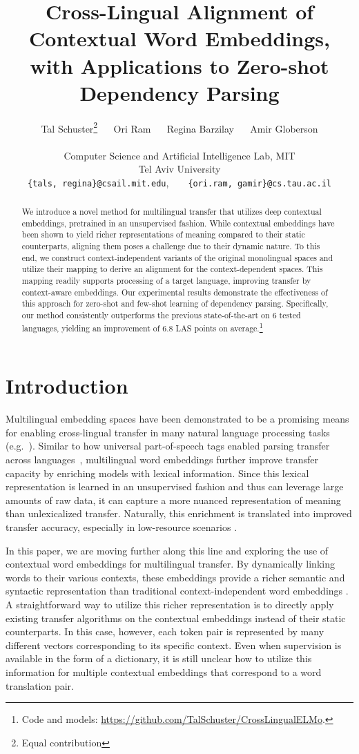 \documentclass[11pt,a4paper]{article}
\title{Cross-Lingual Alignment of Contextual Word Embeddings,  \\ with Applications to Zero-shot Dependency Parsing}
\author{Tal Schuster\thanks{\;\; Equal contribution} ~~ Ori Ram ~~
Regina Barzilay ~~
Amir Globerson \\
\mbox{}\\
Computer Science and Artificial Intelligence Lab, MIT \\
Tel Aviv University \\
\small{\texttt{\{tals, regina\}@csail.mit.edu},~~~~\texttt{\{ori.ram, gamir\}@cs.tau.ac.il}}}
\date{}
\begin{document}
\maketitle


\begin{abstract}
We introduce a novel method for multilingual transfer that utilizes deep contextual embeddings, pretrained in an unsupervised fashion.
While contextual embeddings have been shown to yield richer representations of meaning compared to their static counterparts, aligning them poses a challenge due to their dynamic nature.
To this end, we construct context-independent variants of the original monolingual spaces and utilize their mapping to derive an alignment for the context-dependent spaces. 
This mapping readily supports processing of a target language, improving transfer by context-aware embeddings.
Our experimental results demonstrate the effectiveness of this approach for zero-shot and few-shot learning of dependency parsing. Specifically, our method consistently outperforms the previous state-of-the-art on 6 tested languages, yielding an improvement of 6.8 LAS points on average.\footnote{Code and models: \url{https://github.com/TalSchuster/CrossLingualELMo}.}
\end{abstract} \section{Introduction}


Multilingual embedding spaces have been demonstrated to be a promising means for enabling cross-lingual transfer in many natural language processing tasks (e.g.\ \citet{ammar_one_2016, lample2018unsupervised}). Similar to how universal part-of-speech tags enabled parsing transfer across languages~\cite{petrov2012universal}, multilingual word embeddings further improve transfer capacity by enriching models with lexical information.
Since this lexical representation is learned in an unsupervised fashion and thus can leverage large amounts of raw data, it can capture a more nuanced representation of meaning than unlexicalized transfer. Naturally, this enrichment is translated into improved transfer accuracy, especially in low-resource scenarios \cite{guo2015cross}. 

In this paper, we are moving further along this line and exploring the use of contextual word embeddings for multilingual transfer. 
By dynamically linking words to their various contexts, these embeddings provide a richer semantic and syntactic representation than traditional context-independent word embeddings \citep{peters_deep_2018}. A straightforward way to utilize this richer representation is to directly apply existing transfer algorithms on the contextual embeddings instead of their static counterparts. 
In this case, however, each token pair is represented by many different vectors corresponding to its specific context. 
Even when supervision is available in the form of a dictionary, it is still unclear how to utilize this information for multiple contextual embeddings that correspond to a word translation pair.
\end{document}
